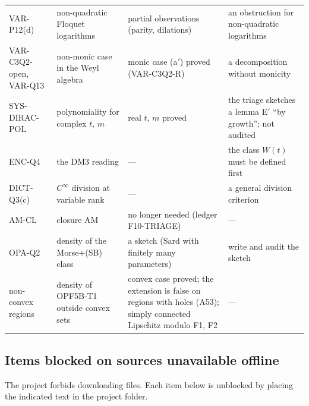 \documentclass[11pt]{article}
\theoremstyle{plain}
\theoremstyle{definition}
\theoremstyle{remark}
\begin{document}
\begin{center}
\begin{longtable}{@{}L{2.5cm}L{4.0cm}L{4.2cm}L{4.0cm}@{}}
VAR-P12(d) & non-quadratic Floquet logarithms & partial observations (parity, dilations) & an obstruction for non-quadratic logarithms\\
VAR-C3Q2-open, VAR-Q13 & non-monic case in the Weyl algebra & monic case (a$'$) proved (VAR-C3Q2-R) & a decomposition without monicity\\
SYS-DIRAC-POL & polynomiality for complex $t$, $m$ & real $t$, $m$ proved & the triage sketches a lemma E$'$ ``by growth''; not audited\\
ENC-Q4 & the DM3 reading & --- & the class $W(t)$ must be defined first\\
DICT-Q3(c) & $C^\infty$ division at variable rank & --- & a general division criterion\\
AM-CL & closure AM & no longer needed (ledger F10-TRIAGE) & ---\\
OPA-Q2 & density of the Morse$+$(SB) class & a sketch (Sard with finitely many parameters) & write and audit the sketch\\
non-convex regions & density of OPF5B-T1 outside convex sets & convex case proved; the extension is false on regions with holes (A53); simply connected Lipschitz modulo F1, F2 & ---\\
\bottomrule
\end{longtable}
\end{center}

\subsection{Items blocked on sources unavailable offline}

The project forbids downloading files. Each item below is unblocked by placing the indicated text in the project folder.
\end{document}
